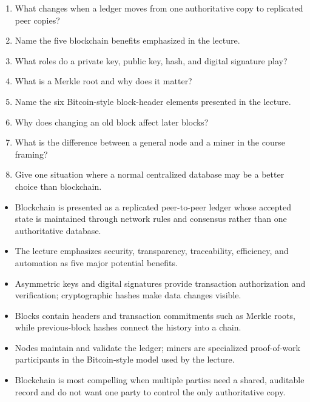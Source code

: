 \begin{quickcheck}
\begin{enumerate}
  \item What changes when a ledger moves from one authoritative copy to replicated peer copies?
  \item Name the five blockchain benefits emphasized in the lecture.
  \item What roles do a private key, public key, hash, and digital signature play?
  \item What is a Merkle root and why does it matter?
  \item Name the six Bitcoin-style block-header elements presented in the lecture.
  \item Why does changing an old block affect later blocks?
  \item What is the difference between a general node and a miner in the course framing?
  \item Give one situation where a normal centralized database may be a better choice than blockchain.
\end{enumerate}
\end{quickcheck}

\begin{chapterrecap}
\begin{itemize}
  \item Blockchain is presented as a replicated peer-to-peer ledger whose accepted state is maintained through network rules and consensus rather than one authoritative database.
  \item The lecture emphasizes security, transparency, traceability, efficiency, and automation as five major potential benefits.
  \item Asymmetric keys and digital signatures provide transaction authorization and verification; cryptographic hashes make data changes visible.
  \item Blocks contain headers and transaction commitments such as Merkle roots, while previous-block hashes connect the history into a chain.
  \item Nodes maintain and validate the ledger; miners are specialized proof-of-work participants in the Bitcoin-style model used by the lecture.
  \item Blockchain is most compelling when multiple parties need a shared, auditable record and do not want one party to control the only authoritative copy.
\end{itemize}
\end{chapterrecap}


